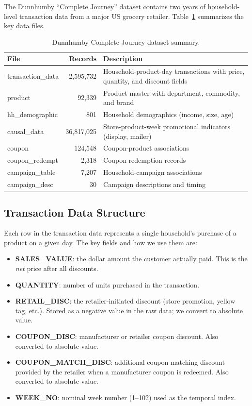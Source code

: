 \documentclass[12pt,a4paper]{article}
\begin{document}
The Dunnhumby ``Complete Journey'' dataset contains two years of
household-level transaction data from a major US grocery retailer.
Table~\ref{tab:data-summary} summarizes the key data files.

\begin{table}[H]
\centering
\caption{Dunnhumby Complete Journey dataset summary.}
\label{tab:data-summary}
\begin{tabular}{lrp{6cm}}
\toprule
\textbf{File} & \textbf{Records} & \textbf{Description} \\
\midrule
transaction\_data & 2,595,732 & Household-product-day transactions
with price, quantity, and discount fields \\
product & 92,339 & Product master with department, commodity, and
brand \\
hh\_demographic & 801 & Household demographics (income, size, age) \\
causal\_data & 36,817,025 & Store-product-week promotional
indicators (display, mailer) \\
coupon & 124,548 & Coupon-product associations \\
coupon\_redempt & 2,318 & Coupon redemption records \\
campaign\_table & 7,207 & Household-campaign associations \\
campaign\_desc & 30 & Campaign descriptions and timing \\
\bottomrule
\end{tabular}
\end{table}

\subsection{Transaction Data Structure}

Each row in the transaction data represents a single household's
purchase of a product on a given day. The key fields and how we use
them are:

\begin{itemize}[nosep]
\item \textbf{SALES\_VALUE}: the dollar amount the customer actually
paid. This is the \emph{net} price after all discounts.

\item \textbf{QUANTITY}: number of units purchased in the transaction.

\item \textbf{RETAIL\_DISC}: the retailer-initiated discount (store
promotion, yellow tag, etc.). Stored as a negative value in the raw
data; we convert to absolute value.

\item \textbf{COUPON\_DISC}: manufacturer or retailer coupon discount.
Also converted to absolute value.

\item \textbf{COUPON\_MATCH\_DISC}: additional coupon-matching
discount provided by the retailer when a manufacturer coupon is
redeemed. Also converted to absolute value.

\item \textbf{WEEK\_NO}: nominal week number (1--102) used as the
temporal index.
\end{itemize}
\end{document}

